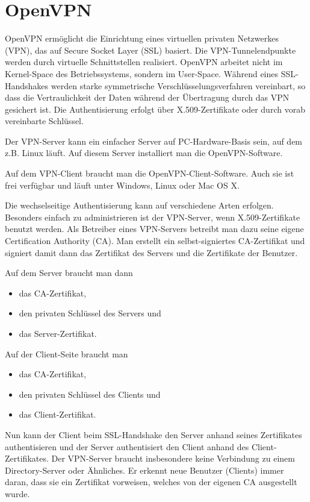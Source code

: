 \section{OpenVPN}
\label{sec:openvpn}

OpenVPN ermöglicht die Einrichtung eines virtuellen privaten Netzwerkes (VPN),
das auf Secure Socket Layer (SSL) basiert. Die VPN-Tunnelendpunkte werden durch
virtuelle Schnittstellen realisiert. OpenVPN arbeitet nicht im Kernel-Space des
Betriebssystems, sondern im User-Space. Während eines SSL-Handshakes werden
starke symmetrische Verschlüsselungsverfahren vereinbart, so dass die
Vertraulichkeit der Daten während der Übertragung durch das VPN gesichert
ist. Die Authentisierung erfolgt über X.509-Zertifikate oder durch vorab
vereinbarte Schlüssel.

Der VPN-Server kann ein einfacher Server auf PC-Hardware-Basis sein, auf dem
z.B. Linux läuft. Auf diesem Server installiert man die OpenVPN-Software.

Auf dem VPN-Client braucht man die OpenVPN-Client-Software. Auch sie ist frei
verfügbar und läuft unter Windows, Linux oder Mac OS X.

Die wechselseitige Authentisierung kann auf verschiedene Arten
erfolgen. Besonders einfach zu administrieren ist der VPN-Server, wenn
X.509-Zertifikate benutzt werden. Als Betreiber eines VPN-Servers betreibt man
dazu seine eigene Certification Authority (CA). Man erstellt ein
selbst-signiertes CA-Zertifikat und signiert damit dann das Zertifikat des
Servers und die Zertifikate der Benutzer.

Auf dem Server braucht man dann

\begin{itemize}
  \item das CA-Zertifikat,
  \item den privaten Schlüssel des Servers und
  \item das Server-Zertifikat.
\end{itemize}

Auf der Client-Seite braucht man

\begin{itemize}
  \item das CA-Zertifikat,
  \item den privaten Schlüssel des Clients und
  \item das Client-Zertifikat.
\end{itemize}

Nun kann der Client beim SSL-Handshake den Server anhand seines Zertifikates
authentisieren und der Server authentisiert den Client anhand des
Client-Zertifikates. Der VPN-Server braucht insbesondere keine Verbindung zu
einem Directory-Server oder Ähnliches. Er erkennt neue Benutzer (Clients) immer
daran, dass sie ein Zertifikat vorweisen, welches von der eigenen CA ausgestellt
wurde.

